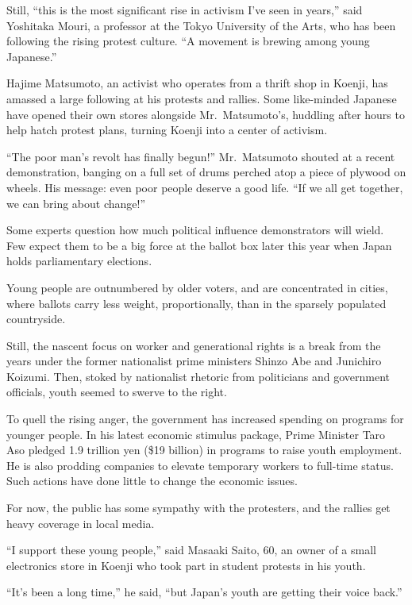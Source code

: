 ﻿\documentclass[12pt]{article}
\begin{document}
Still, ``this is the most significant rise in activism I've seen in years,'' said Yoshitaka Mouri, a
professor at the Tokyo University of the Arts, who has been following the rising protest culture.
``A movement is brewing among young Japanese.''

Hajime Matsumoto, an activist who operates from a thrift shop in Koenji, has amassed a large
following at his protests and rallies. Some like-minded Japanese have opened their own stores
alongside Mr.~Matsumoto's, huddling after hours to help hatch protest plans, turning Koenji into a
center of activism.

``The poor man's revolt has finally begun!'' Mr.~Matsumoto shouted at a recent demonstration,
banging on a full set of drums perched atop a piece of plywood on wheels. His message: even poor
people deserve a good life. ``If we all get together, we can bring about change!''

Some experts question how much political influence demonstrators will wield. Few expect them to be a
big force at the ballot box later this year when Japan holds parliamentary elections.

Young people are outnumbered by older voters, and are concentrated in cities, where ballots carry
less weight, proportionally, than in the sparsely populated countryside.

Still, the nascent focus on worker and generational rights is a break from the years under the
former nationalist prime ministers Shinzo Abe and Junichiro Koizumi. Then, stoked by nationalist
rhetoric from politicians and government officials, youth seemed to swerve to the right.

To quell the rising anger, the government has increased spending on programs for younger people. In
his latest economic stimulus package, Prime Minister Taro Aso pledged 1.9 trillion yen (\$19
billion) in programs to raise youth employment. He is also prodding companies to elevate temporary
workers to full-time status. Such actions have done little to change the economic issues.

For now, the public has some sympathy with the protesters, and the rallies get heavy coverage in
local media.

``I support these young people,'' said Masaaki Saito, 60, an owner of a small electronics store in
Koenji who took part in student protests in his youth.

``It's been a long time,'' he said, ``but Japan's youth are getting their voice back.''
\end{document}
